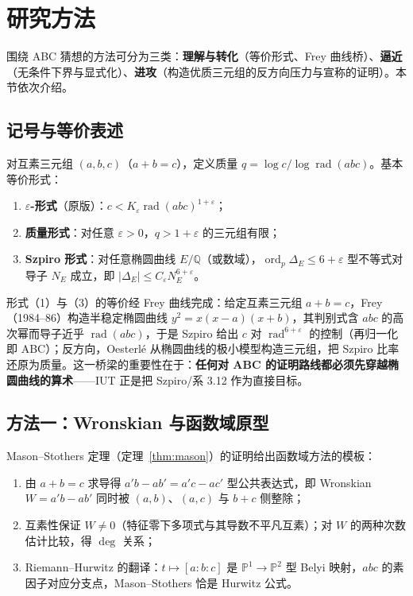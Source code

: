 \section{研究方法}\label{sec:methods}

围绕 ABC 猜想的方法可分为三类：\textbf{理解与转化}（等价形式、Frey 曲线桥）、\textbf{逼近}（无条件下界与显式化）、\textbf{进攻}（构造优质三元组的反方向压力与宣称的证明）。本节依次介绍。

\subsection{记号与等价表述}

对互素三元组 $(a, b, c)$（$a + b = c$），定义质量 $q = \log c / \log \operatorname{rad}(abc)$。基本等价形式：

\begin{enumerate}[label=(\arabic*)]
    \item \textbf{$\varepsilon$-形式}（原版）：$c < K_\varepsilon \operatorname{rad}(abc)^{1+\varepsilon}$；
    \item \textbf{质量形式}：对任意 $\varepsilon > 0$，$q > 1 + \varepsilon$ 的三元组有限；
    \item \textbf{Szpiro 形式}：对任意椭圆曲线 $E/\mathbb{Q}$（或数域），$\operatorname{ord}_p \Delta_E \leq 6 + \varepsilon$ 型不等式对导子 $N_E$ 成立，即 $|\Delta_E| \leq C_\varepsilon N_E^{6+\varepsilon}$。
\end{enumerate}

形式（1）与（3）的等价经 Frey 曲线完成：给定互素三元组 $a + b = c$，Frey（1984--86）构造半稳定椭圆曲线 $y^2 = x(x-a)(x+b)$，其判别式含 $abc$ 的高次幂而导子近乎 $\operatorname{rad}(abc)$，于是 Szpiro 给出 $c$ 对 $\operatorname{rad}^{6+\varepsilon}$ 的控制（再归一化即 ABC）；反方向，Oesterl\'e 从椭圆曲线的极小模型构造三元组，把 Szpiro 比率还原为质量。这一桥梁的重要性在于：\textbf{任何对 ABC 的证明路线都必须先穿越椭圆曲线的算术}——IUT 正是把 Szpiro/系 3.12 作为直接目标。

\subsection{方法一：Wronskian 与函数域原型}

Mason--Stothers 定理（定理~\ref{thm:mason}）的证明给出函数域方法的模板：

\begin{enumerate}[label=(\arabic*)]
    \item 由 $a + b = c$ 求导得 $a' b - a b' = a' c - a c'$ 型公共表达式，即 Wronskian $W = a'b - ab'$ 同时被 $(a,b)$、$(a,c)$ 与 $b + c$ 侧整除；
    \item 互素性保证 $W \neq 0$（特征零下多项式与其导数不平凡互素）；对 $W$ 的两种次数估计比较，得 $\deg$ 关系；
    \item Riemann--Hurwitz 的翻译：$t \mapsto [a : b : c]$ 是 $\mathbb{P}^1 \to \mathbb{P}^2$ 型 Belyi 映射，$abc$ 的素因子对应分支点，Mason--Stothers 恰是 Hurwitz 公式。
\end{enumerate}

